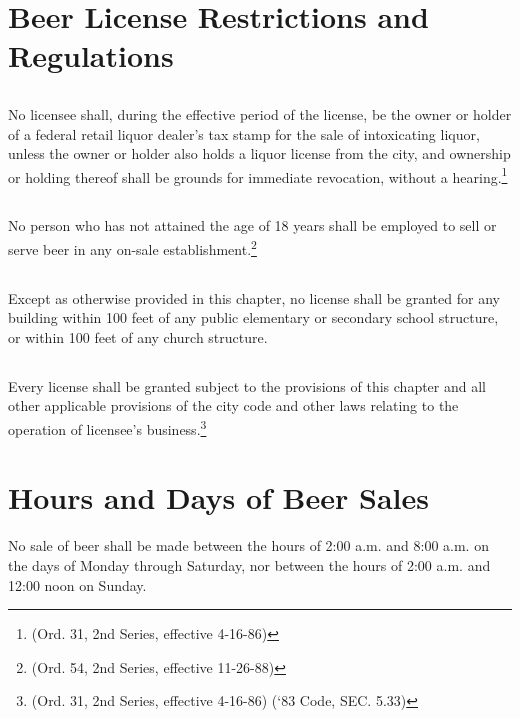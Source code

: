 \section{Beer License Restrictions and Regulations}
\subsection{}
No licensee shall, during the effective period of the license, be the owner or holder of a federal retail liquor dealer’s tax stamp for the sale of intoxicating liquor, unless the owner or holder also holds a liquor license from the city, and ownership or holding thereof shall be grounds for immediate revocation, without a hearing.\footnote{(Ord. 31, 2nd Series, effective 4-16-86)}
\subsection{}
No person who has not attained the age of 18 years shall be employed to sell or serve beer in any on-sale establishment.\footnote{(Ord. 54, 2nd Series, effective 11-26-88)}
\subsection{}
Except as otherwise provided in this chapter, no license shall be granted for any building within 100 feet of any public elementary or secondary school structure, or within 100 feet of any church structure.
\subsection{}
Every license shall be granted subject to the provisions of this chapter and all other applicable provisions of the city code and other laws relating to the operation of licensee’s business.\footnote{(Ord. 31, 2nd Series, effective 4-16-86) (‘83 Code, SEC. 5.33)}

\section{Hours and Days of Beer Sales}
No sale of beer shall be made between the hours of 2:00 a.m. and 8:00 a.m. on the days of Monday through Saturday, nor between the hours of 2:00 a.m. and 12:00 noon on Sunday.

